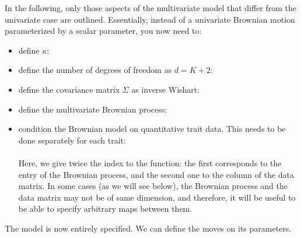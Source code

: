 In the following, only those aspects of the multivariate model that differ from the univariate case are outlined.
Essentially, instead of a univariate Brownian motion parameterized by a scalar parameter, you now need to:
\begin{itemize}
\item
define $\kappa$:
\\
\item
define the number of degrees of freedom as $d = K+2$:
\\
\item
define the covariance matrix $\Sigma$ as inverse Wishart:
\\
\item
define the multivariate Brownian process:
\\
\item
condition the Brownian model on quantitative trait data.
This needs to be done separately for each trait:
\\
\\
Here, we give twice the index  to the  function: the first corresponds to the entry of the Brownian process, and the second one to the column of the data matrix. In some cases (as we will see below), the Brownian process and the data matrix may not be of same dimension, and therefore, it will be useful to be able to specify arbitrary maps between them.
\end{itemize}
The model is now entirely specified. We can define the moves on its parameters.

